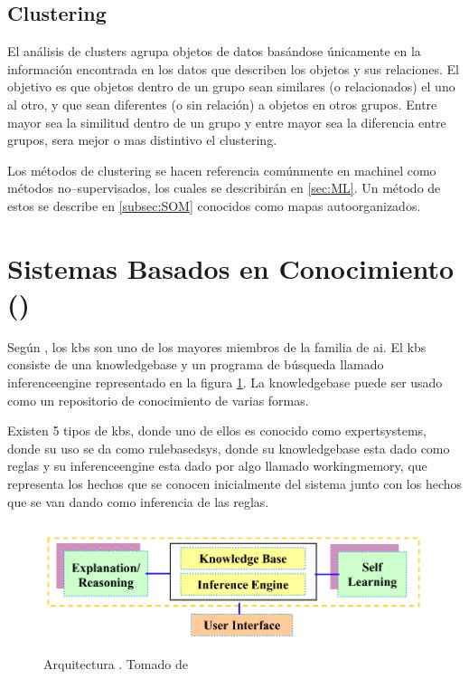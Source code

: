 \subsection{Clustering} \label{subsec:clustering}
El análisis de clusters agrupa objetos de datos basándose únicamente en la información encontrada en los datos que describen los objetos y sus relaciones. El objetivo es que objetos dentro de un grupo sean similares (o relacionados) el uno al otro, y que sean diferentes (o sin relación) a objetos en otros grupos. Entre mayor sea la similitud dentro de un grupo y entre mayor sea la diferencia entre grupos, sera mejor o mas distintivo el clustering.

Los métodos de clustering se hacen referencia comúnmente en \gls{machinel} como métodos no--supervisados, los cuales se describirán en \ref{sec:ML}. Un método de estos se describe en \ref{subsec:SOM} conocidos como mapas autoorganizados.


\section{Sistemas Basados en Conocimiento ()} \label{sec:KBS}
Según \cite{sajja2010knowledge}, los \gls{kbs} son uno de los mayores miembros de la familia de \gls{ai}. El \gls{kbs} consiste de una \gls{knowledgebase} y un programa de búsqueda llamado \gls{inferenceengine} representado en la figura \ref{fig:kbs-arch}. La \gls{knowledgebase} puede ser usado como un repositorio de conocimiento de varias formas.

Existen 5 tipos de \gls{kbs}, donde uno de ellos es conocido como \gls{expertsystems}, donde su uso se da como \gls{rulebasedsys}, donde su \gls{knowledgebase} esta dado como reglas y su \gls{inferenceengine} esta dado por algo llamado \gls{workingmemory}, que representa los hechos que se conocen inicialmente del sistema junto con los hechos que se van dando como inferencia de las reglas.

\begin{figure}[th]
\centering
\includegraphics[scale=0.4]{Figures/kbs-architecture.png}
\decoRule
\caption[Arquitectura ]{Arquitectura . Tomado de \cite{sajja2010knowledge}}
\label{fig:kbs-arch}
\end{figure}


